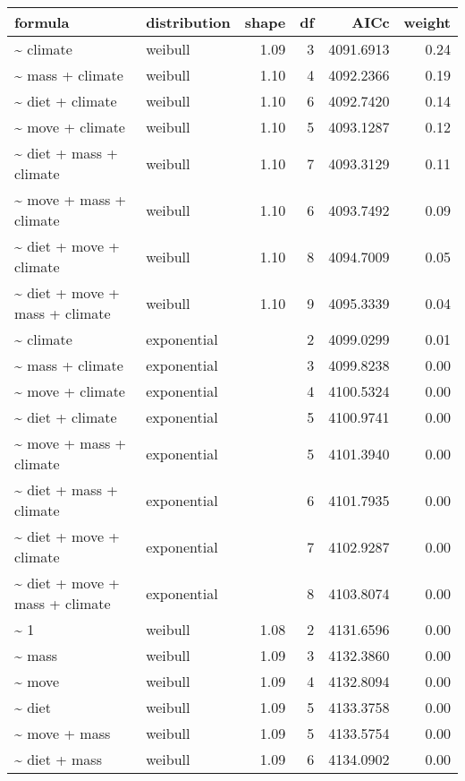 \begin{table}[ht]
\centering
\begin{tabular}{llrrrr}
 formula & distribution & shape & df & AICc & weight \\ 
  \hline
\~{} climate & weibull & 1.09 & 3 & 4091.6913 & 0.24 \\ 
  \~{} mass + climate & weibull & 1.10 & 4 & 4092.2366 & 0.19 \\ 
  \~{} diet + climate & weibull & 1.10 & 6 & 4092.7420 & 0.14 \\ 
  \~{} move + climate & weibull & 1.10 & 5 & 4093.1287 & 0.12 \\ 
  \~{} diet + mass + climate & weibull & 1.10 & 7 & 4093.3129 & 0.11 \\ 
  \~{} move + mass + climate & weibull & 1.10 & 6 & 4093.7492 & 0.09 \\ 
  \~{} diet + move + climate & weibull & 1.10 & 8 & 4094.7009 & 0.05 \\ 
  \~{} diet + move + mass + climate & weibull & 1.10 & 9 & 4095.3339 & 0.04 \\ 
  \~{} climate & exponential &  & 2 & 4099.0299 & 0.01 \\ 
  \~{} mass + climate & exponential &  & 3 & 4099.8238 & 0.00 \\ 
  \~{} move + climate & exponential &  & 4 & 4100.5324 & 0.00 \\ 
  \~{} diet + climate & exponential &  & 5 & 4100.9741 & 0.00 \\ 
  \~{} move + mass + climate & exponential &  & 5 & 4101.3940 & 0.00 \\ 
  \~{} diet + mass + climate & exponential &  & 6 & 4101.7935 & 0.00 \\ 
  \~{} diet + move + climate & exponential &  & 7 & 4102.9287 & 0.00 \\ 
  \~{} diet + move + mass + climate & exponential &  & 8 & 4103.8074 & 0.00 \\ 
  \~{} 1 & weibull & 1.08 & 2 & 4131.6596 & 0.00 \\ 
  \~{} mass & weibull & 1.09 & 3 & 4132.3860 & 0.00 \\ 
  \~{} move & weibull & 1.09 & 4 & 4132.8094 & 0.00 \\ 
  \~{} diet & weibull & 1.09 & 5 & 4133.3758 & 0.00 \\ 
  \~{} move + mass & weibull & 1.09 & 5 & 4133.5754 & 0.00 \\ 
  \~{} diet + mass & weibull & 1.09 & 6 & 4134.0902 & 0.00 \\ 

\end{tabular}
\end{table}

